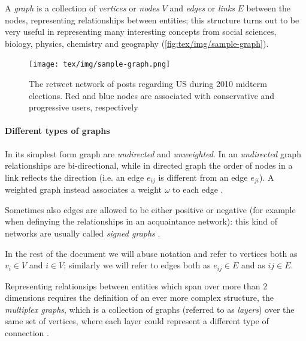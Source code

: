 A \emph{graph} is a collection of \emph{vertices} or \emph{nodes} $V$ and
\emph{edges} or \emph{links} $E$ between the nodes, representing relationships
between entities; this structure turns out to be very useful in
representing many interesting concepts from social sciences, biology, physics,
chemistry and geography (\autoref{fig:tex/img/sample-graph})\cite{Newman2018}\cite{Menczer2020}.

\begin{figure}
	\centering
	\texttt{[image: tex/img/sample-graph.png]}
	\caption[Retweet network during 2010 midterm elections]{The retweet network of posts regarding US during 2010 midterm
		elections. Red and blue nodes are associated with conservative and
		progressive users, respectively \cite{Menczer2020}}%
	\label{fig:tex/img/sample-graph}
\end{figure}

\paragraph{Different types of graphs}%
\label{par:different_types_of_graphs}

In its simplest form graph are \emph{undirected} and \emph{unweighted}. In an
\emph{undirected} graph relationships are bi-directional, while in directed graph
the order of nodes in a link reflects the
direction (i.e. an edge $e_{ij} $ is different from an edge $e_{ji} $). A weighted
graph instead associates a weight $\omega $ to each edge
\cite{Menczer2020}\cite{AlbertLaszloNortheasternUniversity2016}.

Sometimes also edges are allowed to be either positive or negative (for example when
definying the relationships in an acquaintance network): this kind of networks
are usually called \emph{signed graphs} \cite{Newman2018}.

\bigskip

In the rest of the document we will abuse notation and refer to vertices both
as $v_{i} \in V $ and $i \in V$; similarly we will refer to edges both as
$e_{ij} \in E $ and as $ij \in E$.

\bigskip

Representing relationsips between entities which span over more than $2$
dimensions requires the definition of an ever more complex structure, the
\emph{multiplex graphs}, which is a collection of graphs (referred to as
\emph{layers}) over the same set of vertices, where each layer could represent
a different type of connection \cite{Newman2018}.

